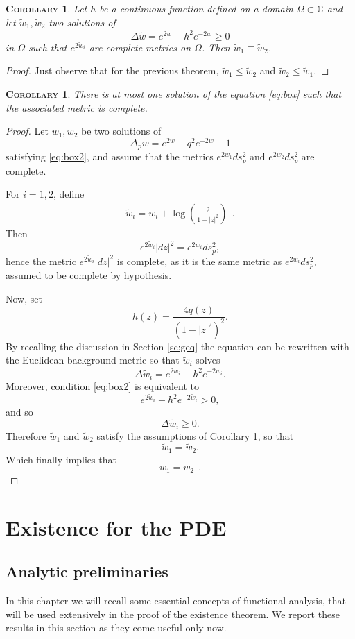 \documentclass[a4paper,11pt,openright,twoside]{book}
\renewcommand{\Omega}{\varOmega}
\newcommand{\C}{\mathbb{C}}
\newcommand{\1}{\mathds{1}}
\theoremstyle{plain}
\newtheorem{cor}[thm]{\textsc{Corollary}}
\theoremstyle{definition}
\theoremstyle{remark}
\begin{document}
\begin{cor}{}{}\label{cor:uni1}
	Let $h$ be a continuous function defined on a domain $\Omega\subset \C$ and let $\tilde w_1, \tilde w_2$ two solutions of 
	\begin{equation}
		\Delta \tilde w  = e^{2\tilde w}-h^2e^{-2\tilde w} \geq 0
	\end{equation}
	in $\Omega$ such that $e^{2\tilde w_i}$ are complete metrics on $\Omega$. Then  $\tilde w_1 \equiv \tilde w_2$.
\end{cor}
\begin{proof}
	Just observe that for the previous theorem, $\tilde w_1 \leq\tilde w_2$ and $\tilde w_2 \leq\tilde w_1$.
\end{proof}
\begin{cor}\label{cor:uni2}
	There is at most one solution of the equation \eqref{eq:box} such that the associated metric is complete.
\end{cor}
\begin{proof}
Let $w_1,w_2$ be two solutions of
\[
\Delta_p w = e^{2w} - q^2 e^{-2w} -1
\]
satisfying \eqref{eq:box2}, and assume that the metrics $e^{2w_1}ds_p^2$ and $e^{2w_2}ds_p^2$ are complete.

For $i=1,2$, define
\begin{align*}
	\tilde w_i = w_i + \log\left(\frac{2}{1-|z|^2}\right)
\ \ .
\end{align*}
Then
\[
e^{2\tilde w_i}|dz|^2 = e^{2w_i}ds_p^2,
\]
hence the metric $e^{2\tilde w_i}|dz|^2$ is complete, as it is the same metric as $e^{2w_i}ds_p^2$, assumed to be complete by hypothesis.

Now, set
\[
h(z)=\frac{4q(z)}{(1-|z|^2)^2}.
\]
By recalling the discussion in Section \ref{sc:geq} the equation can be rewritten with the Euclidean background metric so that $\tilde w_i$ solves
\[
\Delta \tilde w_i = e^{2\tilde w_i}-h^2e^{-2\tilde w_i}.
\]
Moreover, condition \eqref{eq:box2} is equivalent to
\[
e^{2\tilde w_i}-h^2e^{-2\tilde w_i}>0,
\]
and so
\[
\Delta \tilde w_i\ge 0.
\]
Therefore $\tilde w_1$ and $\tilde w_2$ satisfy the assumptions of Corollary \ref{cor:uni1}, so that
\[
\tilde w_1=\tilde w_2.
\]
Which finally implies that
\[
w_1=w_2
\ \ .
\]
\end{proof}
\chapter{Existence for the PDE}
\section{Analytic preliminaries}
In this chapter we will recall some essential concepts of functional analysis, that will be used extensively in the proof of the existence theorem. We report these results in this section as they come useful only now. 
\end{document}
